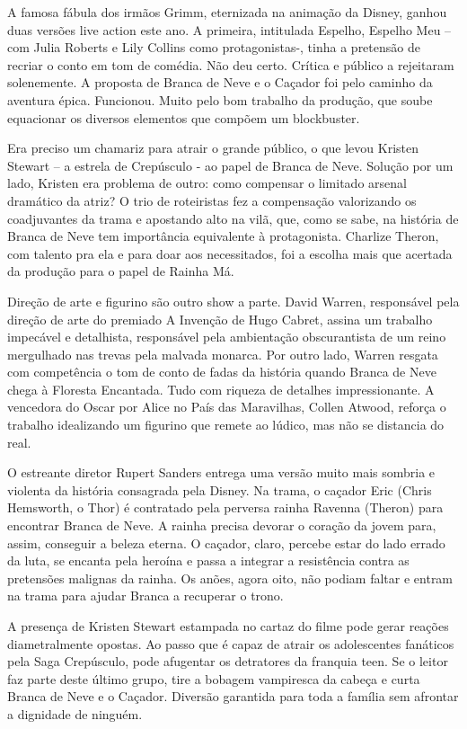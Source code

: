 \documentclass[a4paper,11pt,openright,openbib]{article}
\begin{document}
A famosa fábula dos irmãos Grimm, eternizada na animação da Disney, ganhou duas versões live action este ano. A primeira, intitulada Espelho, Espelho Meu – com Julia Roberts e Lily Collins como protagonistas-, tinha a pretensão de recriar o conto em tom de comédia. Não deu certo. Crítica e público a rejeitaram solenemente. A proposta de Branca de Neve e o Caçador foi pelo caminho da aventura épica. Funcionou. Muito pelo bom trabalho da produção, que soube equacionar os diversos elementos que compõem um blockbuster.

Era preciso um chamariz para atrair o grande público, o que levou Kristen Stewart – a estrela de Crepúsculo - ao papel de Branca de Neve. Solução por um lado, Kristen era problema de outro: como compensar o limitado arsenal dramático da atriz? O trio de roteiristas fez a compensação valorizando os coadjuvantes da trama e apostando alto na vilã, que, como se sabe, na história de Branca de Neve tem importância equivalente à protagonista. Charlize Theron, com talento pra ela e para doar aos necessitados, foi a escolha mais que acertada da produção para o papel de Rainha Má. 

Direção de arte e figurino são outro show a parte. David Warren, responsável pela direção de arte do premiado A Invenção de Hugo Cabret, assina um trabalho impecável e detalhista, responsável pela ambientação obscurantista de um reino mergulhado nas trevas pela malvada monarca. Por outro lado, Warren resgata com competência o tom de conto de fadas da história quando Branca de Neve chega à Floresta Encantada. Tudo com riqueza de detalhes impressionante. A vencedora do Oscar por Alice no País das Maravilhas, Collen Atwood, reforça o trabalho idealizando um figurino que remete ao lúdico, mas não se distancia do real. 

O estreante diretor Rupert Sanders entrega uma versão muito mais sombria e violenta da história consagrada pela Disney. Na trama, o caçador Eric (Chris Hemsworth, o Thor) é contratado pela perversa rainha Ravenna (Theron) para encontrar Branca de Neve. A rainha precisa devorar o coração da jovem para, assim, conseguir a beleza eterna. O caçador, claro, percebe estar do lado errado da luta, se encanta pela heroína e passa a integrar a resistência contra as pretensões malignas da rainha. Os anões, agora oito, não podiam faltar e entram na trama para ajudar Branca a recuperar o trono.

A presença de Kristen Stewart estampada no cartaz do filme pode gerar reações diametralmente opostas. Ao passo que é capaz de atrair os adolescentes fanáticos pela Saga Crepúsculo, pode afugentar os detratores da franquia teen. Se o leitor faz parte deste último grupo, tire a bobagem vampiresca da cabeça e curta Branca de Neve e o Caçador. Diversão garantida para toda a família sem afrontar a dignidade de ninguém. 
\end{document}
